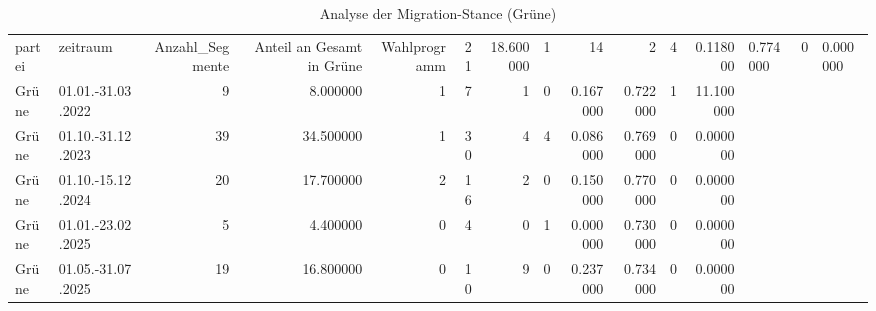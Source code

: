 \begin{table}
\caption{Analyse der Migration-Stance (Grüne)}
\label{tab:meine_tabelle}
\begin{tabular}{llrrrrrrrrrr}
\toprule
partei & zeitraum & Anzahl_Segmente & Anteil an Gesamt in %
\midrule
Grüne & Wahlprogramm & 21 & 18.600000 & 1 & 14 & 2 & 4 & 0.118000 & 0.774000 & 0 & 0.000000 \\
Grüne & 01.01.-31.03.2022 & 9 & 8.000000 & 1 & 7 & 1 & 0 & 0.167000 & 0.722000 & 1 & 11.100000 \\
Grüne & 01.10.-31.12.2023 & 39 & 34.500000 & 1 & 30 & 4 & 4 & 0.086000 & 0.769000 & 0 & 0.000000 \\
Grüne & 01.10.-15.12.2024 & 20 & 17.700000 & 2 & 16 & 2 & 0 & 0.150000 & 0.770000 & 0 & 0.000000 \\
Grüne & 01.01.-23.02.2025 & 5 & 4.400000 & 0 & 4 & 0 & 1 & 0.000000 & 0.730000 & 0 & 0.000000 \\
Grüne & 01.05.-31.07.2025 & 19 & 16.800000 & 0 & 10 & 9 & 0 & 0.237000 & 0.734000 & 0 & 0.000000 \\
\bottomrule
\end{tabular}
\end{table}
